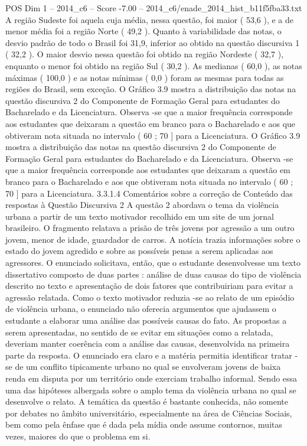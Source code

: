 \begin{textsample}{POS Dim 1 – 2014\_c6 – Score -7.00 – 2014\_c6/enade\_2014\_hist\_b11f5fba33.txt}
A região Sudeste foi aquela cuja média, nessa questão, foi maior ( 53,6 ), e a de menor média foi a região Norte ( 49,2 ).
Quanto à variabilidade das notas, o desvio padrão de todo o Brasil foi 31,9, inferior ao obtido na questão discursiva 1 ( 32,2 ).
O maior desvio nessa questão foi obtido na região Nordeste ( 32,7 ), enquanto o menor foi obtido na região Sul ( 30,2 ).
As medianas ( 60,0 ), as notas máximas ( 100,0 ) e as notas mínimas ( 0,0 ) foram as mesmas para todas as regiões do Brasil, sem exceção.
O Gráfico 3.9 mostra a distribuição das notas na questão discursiva 2 do Componente de Formação Geral para estudantes do Bacharelado e da Licenciatura.
Observa -se que a maior frequência corresponde aos estudantes que deixaram a questão em branco para o Bacharelado e aos que obtiveram nota situada no intervalo ( 60 ; 70 ] para a Licenciatura.
O Gráfico 3.9 mostra a distribuição das notas na questão discursiva 2 do Componente de Formação Geral para estudantes do Bacharelado e da Licenciatura.
Observa -se que a maior frequência corresponde aos estudantes que deixaram a questão em branco para o Bacharelado e aos que obtiveram nota situada no intervalo ( 60 ; 70 ] para a Licenciatura. 3.3.1.4 Comentários sobre a correção de Conteúdo das respostas à Questão Discursiva 2 A questão 2 abordava o tema da violência urbana a partir de um texto motivador recolhido em um site de um jornal brasileiro.
O fragmento relatava a prisão de três jovens por agressão a um outro jovem, menor de idade, guardador de carros.
A notícia trazia informações sobre o estado do jovem agredido e sobre as possíveis penas a serem aplicadas aos agressores.
O enunciado solicitava, então, que o estudante desenvolvesse um texto dissertativo composto de duas partes : análise de duas causas do tipo de violência descrito no texto e apresentação de dois fatores que contribuiriam para evitar a agressão relatada.
Como o texto motivador reduzia -se ao relato de um episódio de violência urbana, o enunciado não oferecia argumentos que ajudassem o estudante a elaborar uma análise das possíveis causas do fato.
As propostas a serem apresentadas, no sentido de se evitar em situações como a relatada, deveriam manter coerência com a análise das causas, desenvolvida na primeira parte da resposta.
O enunciado era claro e a matéria permitia identificar tratar -se de um conflito tipicamente urbano no qual se envolveram jovens de baixa renda em disputa por um território onde exerciam trabalho informal.
Sendo essa uma das hipóteses albergada sobre o amplo tema da violência urbana no qual se desenvolve o relato.
A temática da questão é bastante conhecida, não somente por debates no âmbito universitário, especialmente na área de Ciências Sociais, bem como pela ênfase que é dada pela mídia onde assume contornos, muitas vezes, maiores do que o problema em si.

\end{textsample}
